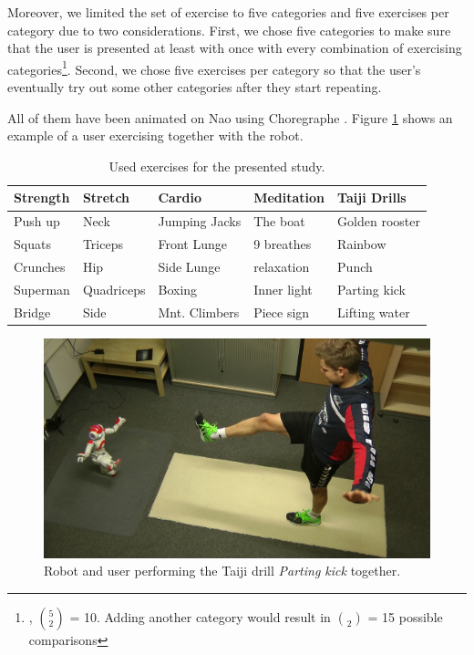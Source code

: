 \documentclass[twocolumn]{svjour3}          %
\begin{document}
Moreover, we limited the set of exercise to five categories and five exercises per category due to two considerations. 
First, we chose five categories to make sure that the user is presented at least with once with every combination of exercising categories\footnote{\ie{}, ${5}\choose{2}$ = 10. Adding another category would result in ${}\choose{2}$ = 15 possible comparisons}. Second, we chose five exercises per category so that the user's eventually try out some other categories after they start repeating. 

All of them have been animated on Nao using Choregraphe
\autocite{pot2009choregraphe,gouaillier2008nao}. Figure
\ref{fig:exercises} shows an example of a user exercising together with
the robot.

\begin{center}
\begin{table} [t!]
\centering
\captionsetup{justification=centering}
\caption{Used exercises for the presented study.}\label{tab:pl:exercises}
\begin{tabular}{@{} *5l @{}}    \toprule
Strength  & Stretch & Cardio & Meditation & Taiji Drills \\ \midrule
  Push up & Neck    & Jumping Jacks & The boat & Golden rooster \\
Squats & Triceps & Front Lunge & 9 breathes & Rainbow\\
 Crunches & Hip  & Side Lunge & relaxation & Punch\\
 Superman & Quadriceps & Boxing & Inner light & Parting kick\\
 Bridge & Side  & Mnt. Climbers & Piece sign & Lifting water\\\bottomrule
\end{tabular}
\end{table}
\end{center}

\begin{figure}[h!]
\includegraphics[width=\columnwidth]{figures/taichi.png}
\caption{Robot and user performing the Taiji drill \textit{Parting kick} together.} \label{fig:exercises}
\end{figure}
\end{document}
